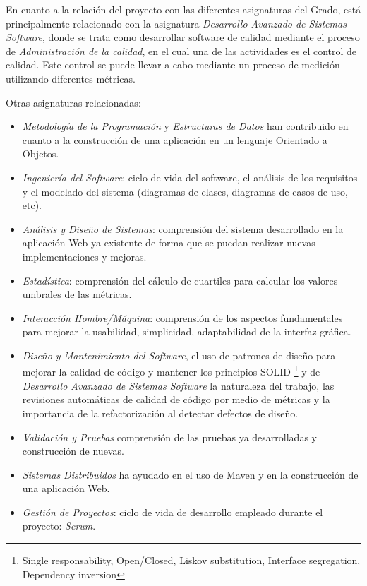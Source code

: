 En cuanto a la relación del proyecto con las diferentes asignaturas del Grado, está principalmente relacionado con la asignatura \textit{Desarrollo Avanzado de Sistemas Software}, donde se trata como desarrollar software de calidad mediante el proceso de \textit{Administración de la calidad}, en el cual una de las actividades es el control de calidad. Este control se puede llevar a cabo mediante un proceso de medición utilizando diferentes métricas.


Otras asignaturas relacionadas: 
\begin{itemize}
	\tightlist
	\item \textit{Metodología de la Programación} y \textit{Estructuras de Datos} han contribuido en cuanto a la construcción de una aplicación en un lenguaje Orientado a Objetos.	
		\item \textit{Ingeniería del Software}: ciclo de vida del software, el análisis de los requisitos y el modelado del sistema (diagramas de clases, diagramas de casos de uso, etc).
		\item \textit{Análisis y Diseño de Sistemas}: comprensión del sistema desarrollado en la aplicación Web ya existente \cite{TFGPrevio} de forma que se puedan realizar nuevas implementaciones y mejoras.
	\item \textit{Estadística}: comprensión del cálculo de cuartiles para calcular los valores umbrales de las métricas.
	\item \textit{Interacción Hombre/Máquina}: comprensión de los aspectos fundamentales para mejorar la usabilidad, simplicidad, adaptabilidad de la interfaz gráfica.
	\item \textit{Diseño y Mantenimiento del Software}, el uso de patrones de diseño para mejorar la calidad de código y mantener los principios SOLID  \footnote{Single responsability, Open/Closed, Liskov substitution, Interface segregation, Dependency inversion} y de \textit{Desarrollo Avanzado de Sistemas Software} la naturaleza del trabajo, las revisiones automáticas de calidad de código por medio de métricas y la importancia de la refactorización al detectar defectos de diseño.
	\item \textit{Validación y Pruebas} comprensión de las pruebas ya desarrolladas y construcción de nuevas.
	\item \textit{Sistemas Distribuidos} ha ayudado en el uso de Maven y en la construcción de una aplicación Web.
	\item \textit{Gestión de Proyectos}: ciclo de vida de desarrollo empleado durante el proyecto: \textit{Scrum}\cite{scrum_master_scrum_2019}.
\end{itemize}

